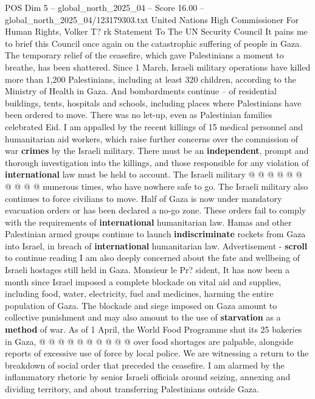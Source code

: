 \begin{textsample}{POS Dim 5 – global\_north\_2025\_04 – Score 16.00 – global\_north\_2025\_04/123179303.txt}  \label{ex:f5_pos_109}
United Nations High Commissioner For Human Rights, Volker T? rk Statement To The UN Security Council It pains me to brief this Council once again on the catastrophic suffering of people in Gaza.
The temporary relief of the ceasefire, which gave Palestinians a moment to breathe, has been shattered.
Since 1 March, Israeli military operations have killed more than 1,200 Palestinians, including at least 320 children, according to the Ministry of Health in Gaza.
And bombardments continue -- of residential buildings, tents, hospitals and schools, including places where Palestinians have been ordered to move.
There was no let-up, even as Palestinian families celebrated Eid.
I am appalled by the recent killings of 15 medical personnel and humanitarian aid workers, which raise further concerns over the commission of war \textbf{crimes} by the Israeli military.
There must be an \textbf{independent}, prompt and thorough investigation into the killings, and those responsible for any violation of \textbf{international} law must be held to account.
The Israeli military @ @ @ @ @ @ @ @ @ @ numerous times, who have nowhere safe to go.
The Israeli military also continues to force civilians to move.
Half of Gaza is now under mandatory evacuation orders or has been declared a no-go zone.
These orders fail to comply with the requirements of \textbf{international} humanitarian law.
Hamas and other Palestinian armed groups continue to launch \textbf{indiscriminate} rockets from Gaza into Israel, in breach of \textbf{international} humanitarian law.
Advertisement - \textbf{scroll} to continue reading I am also deeply concerned about the fate and wellbeing of Israeli hostages still held in Gaza.
Monsieur le Pr? sident, It has now been a month since Israel imposed a complete blockade on vital aid and supplies, including food, water, electricity, fuel and medicines, harming the entire population of Gaza.
The blockade and siege imposed on Gaza amount to collective punishment and may also amount to the use of \textbf{starvation} as a \textbf{method} of war.
As of 1 April, the World Food Programme shut its 25 bakeries in Gaza, @ @ @ @ @ @ @ @ @ @ over food shortages are palpable, alongside reports of excessive use of force by local police.
We are witnessing a return to the breakdown of social order that preceded the ceasefire.
I am alarmed by the inflammatory rhetoric by senior Israeli officials around seizing, annexing and dividing territory, and about transferring Palestinians outside Gaza.

\end{textsample}
